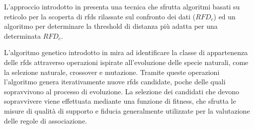 L'approccio introdotto in \cite{rfddiscovery} presenta una tecnica che sfrutta algoritmi basati su reticolo per la scoperta di \acrshort{rfds} rilassate sul confronto dei dati ($RFD_c$) ed un algoritmo per determinare la threshold di distanza pi\`{u} adatta per una determinata $RFD_c$.\par
L'algoritmo genetico introdotto in \cite{evominingrd} mira ad identificare la classe di appartenenza delle \acrshort{rfds} attraverso operazioni ispirate all'evoluzione delle specie naturali, come la selezione naturale, crossover e mutazione. Tramite queste operazioni l'algoritmo genera iterativamente nuove \acrshort{rfds} candidate, poche delle quali sopravvivono al processo di evoluzione. La selezione dei candidati che devono sopravvivere viene effettuata mediante una funzione di fitness, che sfrutta le misure di qualit\`{a} di supporto e fiducia generalmente utilizzate per la valutazione delle regole di associazione. 
